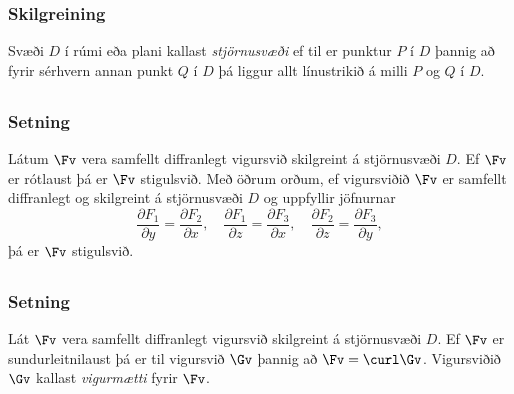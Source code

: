 \subsubsection{Skilgreining \rtask{}}
  Svæði $D$ í rúmi eða plani kallast {\em
  stjörnusvæði} ef til er punktur $P$ í $D$ þannig að fyrir sérhvern
annan punkt $Q$ í $D$ þá liggur allt línustrikið á milli $P$ og $Q$ í
$D$. 








\subsection{} 

\subsubsection{Setning \rtask{}}
Látum $\Fv$ vera samfellt diffranlegt vigursvið
skilgreint á stjörnusvæði $D$.  Ef $\Fv$ er rótlaust þá er $\Fv$
stigulsvið.  Með öðrum orðum, ef vigursviðið  $\Fv$ er samfellt
diffranlegt og skilgreint á stjörnusvæði $D$ og uppfyllir jöfnurnar
$$\frac{\partial F_1}{\partial y}=
\frac{\partial F_2}{\partial x},\quad
\frac{\partial F_1}{\partial z}=
\frac{\partial F_3}{\partial x},\quad
\frac{\partial F_2}{\partial z}=
\frac{\partial F_3}{\partial y},$$
þá er $\Fv$ stigulsvið.







\subsection{} 

\subsubsection{Setning \rtask{}}
 Lát $\Fv$ vera samfellt diffranlegt vigursvið skilgreint á stjörnusvæði $D$.  Ef $\Fv$ er sundurleitnilaust þá er til vigursvið $\Gv$ þannig að $\Fv=\curl\Gv$.  Vigursviðið $\Gv$ kallast {\em vigurmætti} fyrir $\Fv$.





